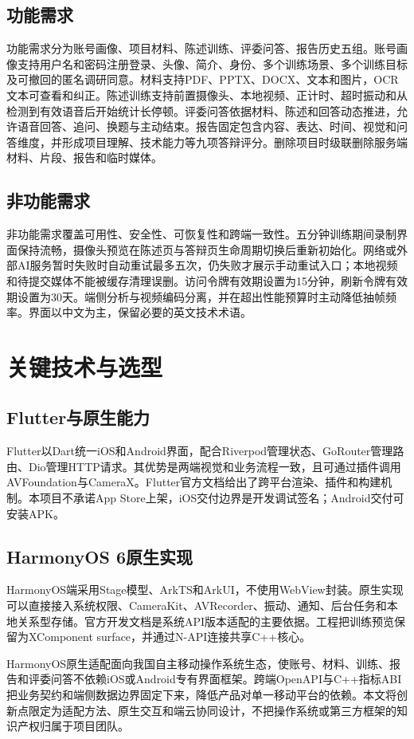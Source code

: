 \section{功能需求}
功能需求分为账号画像、项目材料、陈述训练、评委问答、报告历史五组。账号画像支持用户名和密码注册登录、头像、简介、身份、多个训练场景、多个训练目标及可撤回的匿名调研同意。材料支持PDF、PPTX、DOCX、文本和图片，OCR文本可查看和纠正。陈述训练支持前置摄像头、本地视频、正计时、超时振动和从检测到有效语音后开始统计长停顿。评委问答依据材料、陈述和回答动态推进，允许语音回答、追问、换题与主动结束。报告固定包含内容、表达、时间、视觉和问答维度，并形成项目理解、技术能力等九项答辩评分。删除项目时级联删除服务端材料、片段、报告和临时媒体。

\section{非功能需求}
非功能需求覆盖可用性、安全性、可恢复性和跨端一致性。五分钟训练期间录制界面保持流畅，摄像头预览在陈述页与答辩页生命周期切换后重新初始化。网络或外部AI服务暂时失败时自动重试最多五次，仍失败才展示手动重试入口；本地视频和待提交媒体不能被缓存清理误删。访问令牌有效期设置为15分钟，刷新令牌有效期设置为30天。端侧分析与视频编码分离，并在超出性能预算时主动降低抽帧频率。界面以中文为主，保留必要的英文技术术语。

\chapter{关键技术与选型}
\section{Flutter与原生能力}
Flutter以Dart统一iOS和Android界面，配合Riverpod管理状态、GoRouter管理路由、Dio管理HTTP请求。其优势是两端视觉和业务流程一致，且可通过插件调用AVFoundation与CameraX。Flutter官方文档给出了跨平台渲染、插件和构建机制\cite{flutter}。本项目不承诺App Store上架，iOS交付边界是开发调试签名；Android交付可安装APK。

\section{HarmonyOS 6原生实现}
HarmonyOS端采用Stage模型、ArkTS和ArkUI，不使用WebView封装。原生实现可以直接接入系统权限、CameraKit、AVRecorder、振动、通知、后台任务和本地关系型存储。官方开发文档是系统API版本适配的主要依据\cite{harmonydev}。工程把训练预览保留为XComponent surface，并通过N-API连接共享C++核心。

HarmonyOS原生适配面向我国自主移动操作系统生态，使账号、材料、训练、报告和评委问答不依赖iOS或Android专有界面框架。跨端OpenAPI与C++指标ABI把业务契约和端侧数据边界固定下来，降低产品对单一移动平台的依赖。本文将创新点限定为适配方法、原生交互和端云协同设计，不把操作系统或第三方框架的知识产权归属于项目团队。

